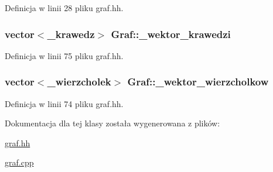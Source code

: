 \-Definicja w linii 28 pliku graf.\-hh.

\hypertarget{class_graf_a79c79b147cde2bb403d3aa27db8f9f22}{
\subsubsection[{\-\_\-wektor\-\_\-krawedzi}]{\setlength{\rightskip}{0pt plus 5cm}vector$<${\bf \-\_\-krawedz}$>$ {\bf \-Graf\-::\-\_\-wektor\-\_\-krawedzi}}}\label{class_graf_a79c79b147cde2bb403d3aa27db8f9f22}


\-Definicja w linii 75 pliku graf.\-hh.

\hypertarget{class_graf_a6156d0fd54662028922b4134a92cb357}{
\subsubsection[{\-\_\-wektor\-\_\-wierzcholkow}]{\setlength{\rightskip}{0pt plus 5cm}vector$<${\bf \-\_\-wierzcholek}$>$ {\bf \-Graf\-::\-\_\-wektor\-\_\-wierzcholkow}}}\label{class_graf_a6156d0fd54662028922b4134a92cb357}


\-Definicja w linii 74 pliku graf.\-hh.



\-Dokumentacja dla tej klasy została wygenerowana z plików\-:\begin{DoxyCompactItemize}
\item 
\hyperlink{graf_8hh}{graf.\-hh}\item 
\hyperlink{graf_8cpp}{graf.\-cpp}\end{DoxyCompactItemize}
